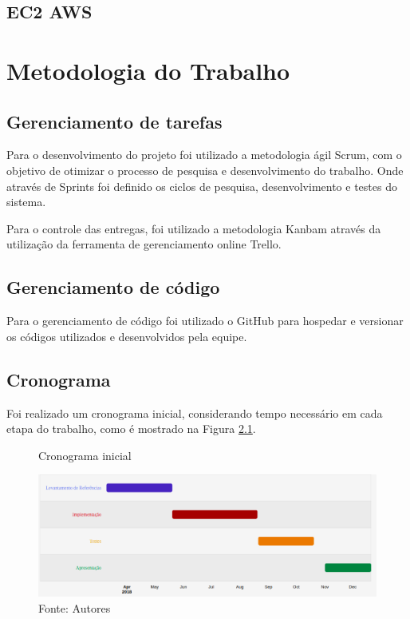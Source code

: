 \documentclass[]{politex}
\begin{document}
\section{EC2 AWS}

\chapter{Metodologia do Trabalho}

\section{Gerenciamento de tarefas}
Para o desenvolvimento do projeto foi utilizado a metodologia ágil Scrum, com o objetivo de otimizar o processo de pesquisa e desenvolvimento do trabalho. Onde através de Sprints foi definido os ciclos de pesquisa,  desenvolvimento e testes do sistema. 

Para o controle das entregas, foi utilizado a metodologia Kanbam através da utilização da ferramenta de gerenciamento online Trello.


\section{Gerenciamento de código}
Para o gerenciamento de código foi utilizado o GitHub para hospedar e versionar os códigos utilizados e desenvolvidos pela equipe.

\section{Cronograma}
Foi realizado um cronograma inicial, considerando tempo necessário em cada etapa do trabalho, como é mostrado na Figura \ref{fig:cronograma}.

\begin{figure}[H]
    \centering
    \caption{Cronograma inicial}
    \includegraphics[width=\textwidth]{metodologia_gantt}
    \caption*{Fonte: Autores}
    \label{fig:cronograma}
\end{figure}
\end{document}
